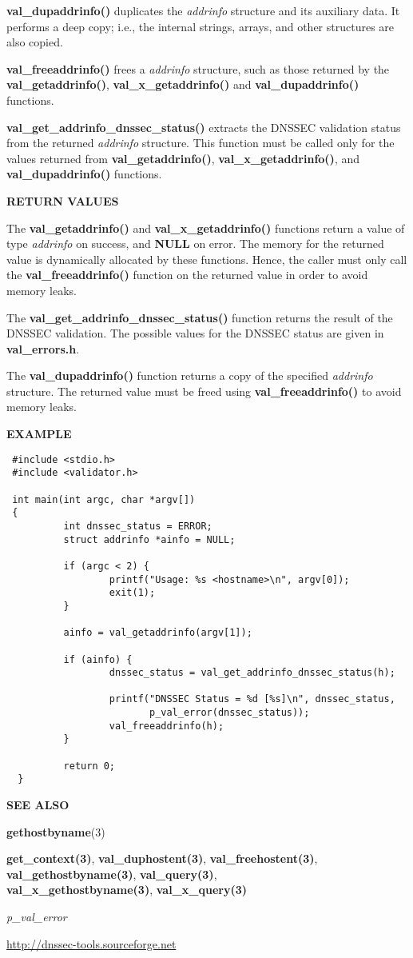 {\bf val\_dupaddrinfo()} duplicates the {\it addrinfo} structure and its
auxiliary data.  It performs a deep copy; i.e., the internal strings, arrays,
and other structures are also copied.

{\bf val\_freeaddrinfo()} frees a {\it addrinfo} structure, such as those
returned by the {\bf val\_getaddrinfo()}, {\bf val\_x\_getaddrinfo()} and {\bf
val\_dupaddrinfo()} functions.

{\bf val\_get\_addrinfo\_dnssec\_status()} extracts the DNSSEC validation
status from the returned {\it addrinfo} structure.  This function must be
called only for the values returned from {\bf val\_getaddrinfo()}, {\bf
val\_x\_getaddrinfo()}, and {\bf val\_dupaddrinfo()} functions.

{\bf RETURN VALUES}

The {\bf val\_getaddrinfo()} and {\bf val\_x\_getaddrinfo()} functions return
a value of type {\it addrinfo} on success, and {\bf NULL} on error.  The
memory for the returned value is dynamically allocated by these functions.
Hence, the caller must only call the {\bf val\_freeaddrinfo()} function on
the returned value in order to avoid memory leaks.

The {\bf val\_get\_addrinfo\_dnssec\_status()} function returns the result
of the DNSSEC validation.  The possible values for the DNSSEC status are given
in {\bf val\_errors.h}.

The {\bf val\_dupaddrinfo()} function returns a copy of the specified {\it
addrinfo} structure.  The returned value must be freed using {\bf
val\_freeaddrinfo()} to avoid memory leaks.

{\bf EXAMPLE}

\begin{verbatim}
 #include <stdio.h>
 #include <validator.h>

 int main(int argc, char *argv[])
 {
          int dnssec_status = ERROR;
          struct addrinfo *ainfo = NULL;

          if (argc < 2) {
                  printf("Usage: %s <hostname>\n", argv[0]);
                  exit(1);
          }
 
          ainfo = val_getaddrinfo(argv[1]);

          if (ainfo) {
                  dnssec_status = val_get_addrinfo_dnssec_status(h);

                  printf("DNSSEC Status = %d [%s]\n", dnssec_status,
                         p_val_error(dnssec_status));
                  val_freeaddrinfo(h);
          }

          return 0;
  }
\end{verbatim}

{\bf SEE ALSO}

{\bf gethostbyname}(3)

{\bf get\_context(3)}, {\bf val\_duphostent(3)}, {\bf val\_freehostent(3)},\\
{\bf val\_gethostbyname(3)}, {\bf val\_query(3)},\\
{\bf val\_x\_gethostbyname(3)}, {\bf val\_x\_query(3)}

{\it p\_val\_error}

\url{http://dnssec-tools.sourceforge.net}

